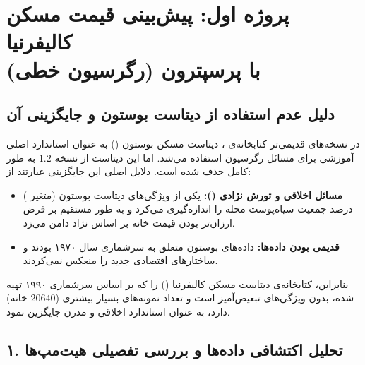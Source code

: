 \section[پروژه مسکن کالیفرنیا]{پروژه اول: پیش‌بینی قیمت مسکن کالیفرنیا \\ با پرسپترون (رگرسیون خطی)}

\begin{stepbox}
\end{stepbox}

\subsection{دلیل عدم استفاده از دیتاست بوستون  و جایگزینی آن}

در نسخه‌های قدیمی‌تر کتابخانه‌ی ، دیتاست مسکن بوستون () به عنوان استاندارد اصلی آموزشی برای مسائل رگرسیون استفاده می‌شد. اما این دیتاست از نسخه $1.2$ به طور کامل حذف شده است. دلایل اصلی این جایگزینی عبارتند از:

\begin{notebox}
\begin{itemize}
    \item \textbf{مسائل اخلاقی و تورش نژادی ():} یکی از ویژگی‌های دیتاست بوستون (متغیر ) درصد جمعیت سیاه‌پوست محله را اندازه‌گیری می‌کرد و به طور مستقیم بر فرض ارزان‌تر بودن قیمت خانه بر اساس نژاد دامن می‌زد.
    \item \textbf{قدیمی بودن داده‌ها:} داده‌های بوستون متعلق به سرشماری سال ۱۹۷۰ بودند و ساختارهای اقتصادی جدید را منعکس نمی‌کردند.
\end{itemize}
بنابراین، کتابخانه‌ی  دیتاست مسکن کالیفرنیا () را که بر اساس سرشماری ۱۹۹۰ تهیه شده، بدون ویژگی‌های تبعیض‌آمیز است و تعداد نمونه‌های بسیار بیشتری ($20640$ خانه) دارد، به عنوان استاندارد اخلاقی و مدرن جایگزین نمود.
\end{notebox}

\subsection{۱. تحلیل اکتشافی داده‌ها  و بررسی تفصیلی هیت‌مپ‌ها}

